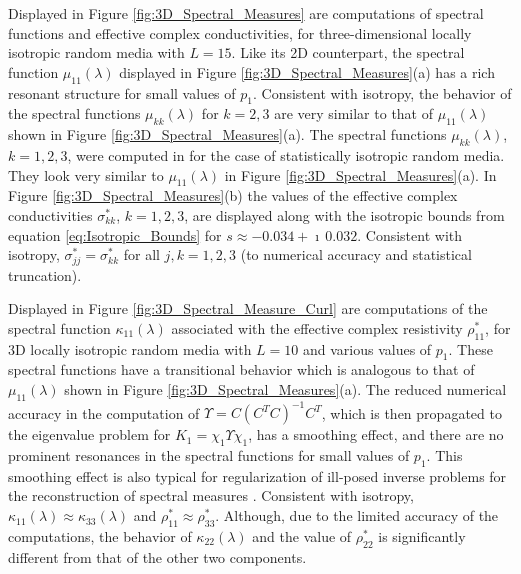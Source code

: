 \documentclass{cmslatex}
\begin{document}
Displayed in Figure \ref{fig:3D_Spectral_Measures} are 
computations of spectral functions and effective complex
conductivities, for three-dimensional locally isotropic random media
with $L=15$. Like its 2D counterpart, the spectral 
function $\mu_{11}(\lambda)$ displayed in Figure
\ref{fig:3D_Spectral_Measures}(a) has a rich resonant structure for
small values of $p_1$. Consistent with isotropy, the behavior of the
spectral functions $\mu_{kk}(\lambda)$ for $k=2,3$ are very similar to that of
$\mu_{11}(\lambda)$ shown in Figure \ref{fig:3D_Spectral_Measures}(a). The
spectral functions $\mu_{kk}(\lambda)$, $k=1,2,3$, were computed in
\cite{Murphy:JMP:063506} for the case of statistically isotropic
random media. They look very similar to $\mu_{11}(\lambda)$ in Figure
\ref{fig:3D_Spectral_Measures}(a). In Figure
\ref{fig:3D_Spectral_Measures}(b) the values of the effective complex
conductivities $\sigma^*_{kk}$, $k=1,2,3$, are displayed along with the
isotropic bounds from equation \eqref{eq:Isotropic_Bounds} for
$s\approx-0.034+\imath\,0.032$. Consistent with isotropy, $\sigma^*_{jj}=\sigma^*_{kk}$ for
all $j,k=1,2,3$ (to numerical accuracy and statistical truncation).




Displayed in Figure \ref{fig:3D_Spectral_Measure_Curl} are 
computations of the spectral function $\kappa_{11}(\lambda)$ associated with the
effective complex resistivity $\rho^*_{11}$, for 3D
locally isotropic random media with $L=10$ and various values of
$p_1$. These spectral functions have a transitional
behavior which is analogous to that of $\mu_{11}(\lambda)$ shown in Figure
\ref{fig:3D_Spectral_Measures}(a). The reduced numerical accuracy
in the computation of $\Upsilon=C(C^TC)^{-1}C^T$, which is then propagated to
the eigenvalue problem for $K_1=\chi_1\Upsilon\chi_1$, has a smoothing effect, and
there are no prominent resonances in the spectral functions for small
values of $p_1$. This smoothing effect is also typical for
regularization of ill-posed inverse problems for the reconstruction of
spectral measures \cite{Cherkaev:IP-1203}. Consistent with isotropy,
$\kappa_{11}(\lambda)\approx\kappa_{33}(\lambda)$ and $\rho^*_{11}\approx\rho^*_{33}$. Although, due to the
limited accuracy of the computations, the behavior of $\kappa_{22}(\lambda)$ and
the value of $\rho^*_{22}$ is significantly different from that of the
other two components.  
 
\end{document}
